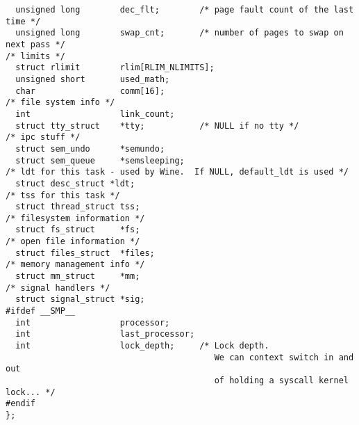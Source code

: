 \begin{tscreen}
\begin{verbatim}
  unsigned long        dec_flt;        /* page fault count of the last time */
  unsigned long        swap_cnt;       /* number of pages to swap on next pass */
/* limits */
  struct rlimit        rlim[RLIM_NLIMITS];
  unsigned short       used_math;
  char                 comm[16];
/* file system info */
  int                  link_count;
  struct tty_struct    *tty;           /* NULL if no tty */
/* ipc stuff */
  struct sem_undo      *semundo;
  struct sem_queue     *semsleeping;
/* ldt for this task - used by Wine.  If NULL, default_ldt is used */
  struct desc_struct *ldt;
/* tss for this task */
  struct thread_struct tss;
/* filesystem information */
  struct fs_struct     *fs;
/* open file information */
  struct files_struct  *files;
/* memory management info */
  struct mm_struct     *mm;
/* signal handlers */
  struct signal_struct *sig;
#ifdef __SMP__
  int                  processor;
  int                  last_processor;
  int                  lock_depth;     /* Lock depth. 
                                          We can context switch in and out
                                          of holding a syscall kernel lock... */  
#endif   
};
\end{verbatim}\end{tscreen}

